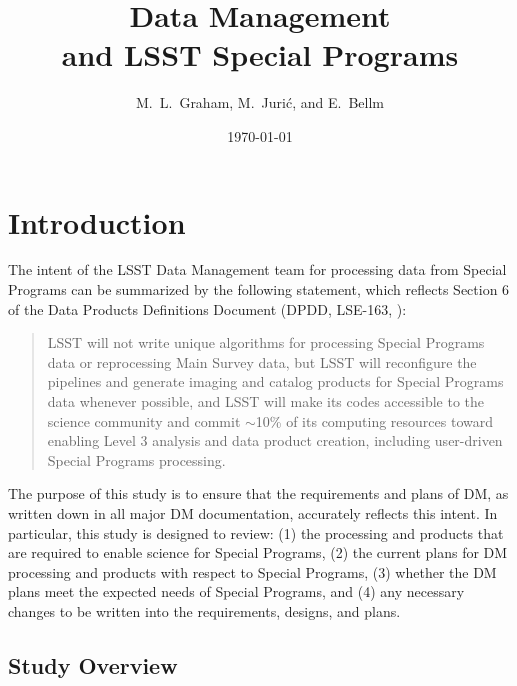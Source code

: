 \documentclass[DM,lsstdraft,toc]{lsstdoc}
\title[LSST Special Programs]{Data Management \\ and LSST Special Programs}
\author{M.~L.~Graham, M.~Juri\'{c}, and E.~Bellm}
\date{\today}
\begin{document}
\maketitle




\section{Introduction} \label{sec:intro}

The intent of the LSST Data Management team for processing data from Special Programs can be summarized by the following statement, which reflects Section 6 of the Data Products Definitions Document (DPDD, LSE-163, \cite{LSE-163}):

\begin{quote}
LSST will not write unique algorithms for processing Special Programs data or reprocessing Main Survey data, but LSST will reconfigure the pipelines and generate imaging and catalog products for Special Programs data whenever possible, and LSST will make its codes accessible to the science community and commit $\sim$10\% of its computing resources toward enabling Level 3 analysis and data product creation, including user-driven Special Programs processing.
\end{quote}

\noindent The purpose of this study is to ensure that the requirements and plans of DM, as written down in all major DM documentation, accurately reflects this intent. In particular, this study is designed to review: (1) the processing and products that are required to enable science for Special Programs, (2) the current plans for DM processing and products with respect to Special Programs, (3) whether the DM plans meet the expected needs of Special Programs, and (4) any necessary changes to be written into the requirements, designs, and plans.

\subsection{Study Overview}\label{ssec:intro_overview}
\end{document}
